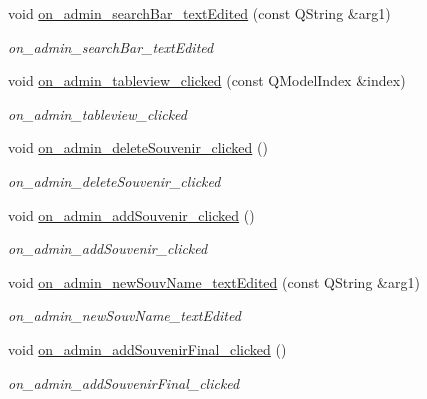 \begin{DoxyCompactItemize}
void \hyperlink{classadmin_a91ddd44ba1bd8aae1fbe23d3d5d1a203}{on\+\_\+admin\+\_\+search\+Bar\+\_\+text\+Edited} (const Q\+String \&arg1)
\begin{DoxyCompactList}\small\item\em on\+\_\+admin\+\_\+search\+Bar\+\_\+text\+Edited \end{DoxyCompactList}\item 
void \hyperlink{classadmin_a566ec88e09d7802376d9cc7bbd38efb1}{on\+\_\+admin\+\_\+tableview\+\_\+clicked} (const Q\+Model\+Index \&index)
\begin{DoxyCompactList}\small\item\em on\+\_\+admin\+\_\+tableview\+\_\+clicked \end{DoxyCompactList}\item 
\mbox{\label{classadmin_aa241f8a9138876546fb155e964ccc4d0}} 
void \hyperlink{classadmin_aa241f8a9138876546fb155e964ccc4d0}{on\+\_\+admin\+\_\+delete\+Souvenir\+\_\+clicked} ()
\begin{DoxyCompactList}\small\item\em on\+\_\+admin\+\_\+delete\+Souvenir\+\_\+clicked \end{DoxyCompactList}\item 
\mbox{\label{classadmin_a20f1035aa7d746053fb575bc98a83583}} 
void \hyperlink{classadmin_a20f1035aa7d746053fb575bc98a83583}{on\+\_\+admin\+\_\+add\+Souvenir\+\_\+clicked} ()
\begin{DoxyCompactList}\small\item\em on\+\_\+admin\+\_\+add\+Souvenir\+\_\+clicked \end{DoxyCompactList}\item 
void \hyperlink{classadmin_a2398941babf4ee8821f6a6ba32581993}{on\+\_\+admin\+\_\+new\+Souv\+Name\+\_\+text\+Edited} (const Q\+String \&arg1)
\begin{DoxyCompactList}\small\item\em on\+\_\+admin\+\_\+new\+Souv\+Name\+\_\+text\+Edited \end{DoxyCompactList}\item 
\mbox{\label{classadmin_a7167cd64dc8582ef4afcba51f6c60bfd}} 
void \hyperlink{classadmin_a7167cd64dc8582ef4afcba51f6c60bfd}{on\+\_\+admin\+\_\+add\+Souvenir\+Final\+\_\+clicked} ()
\begin{DoxyCompactList}\small\item\em on\+\_\+admin\+\_\+add\+Souvenir\+Final\+\_\+clicked \end{DoxyCompactList}\item 

\end{DoxyCompactItemize}
